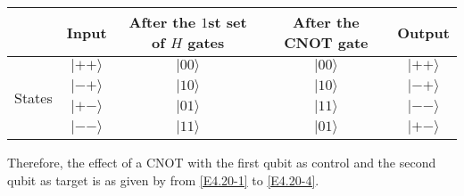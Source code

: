 \documentclass[en]{sol-man}
\begin{document}
\begin{pf}
\begin{table}[h]
        \begin{tabular}{|c|c|c|c|c|}
        \hline
        & Input & After the $1$st set of $H$ gates & After the CNOT gate & Output \\ \hline
        \multirow{4}{*}{States} & $\lvert++\rangle$ & $\lvert 00\rangle$ & $\lvert 00\rangle$ & $\lvert++\rangle$ \\ \cline{2-5}
        & $\lvert-+\rangle$ & $\lvert 10\rangle$ & $\lvert 10\rangle$ & $\lvert-+\rangle$ \\ \cline{2-5} 
        & $\lvert+-\rangle$ & $\lvert 01\rangle$ & $\lvert 11\rangle$ & $\lvert--\rangle$ \\ \cline{2-5}
        & $\lvert--\rangle$ & $\lvert 11\rangle$ & $\lvert 01\rangle$ & $\lvert+-\rangle$ \\ \hline
        \end{tabular}
    \end{table}

    Therefore, the effect of a CNOT with the first qubit as control and the second qubit as target is as given by from \eqref{E4.20-1} to \eqref{E4.20-4}.
\end{pf}
\end{document}
